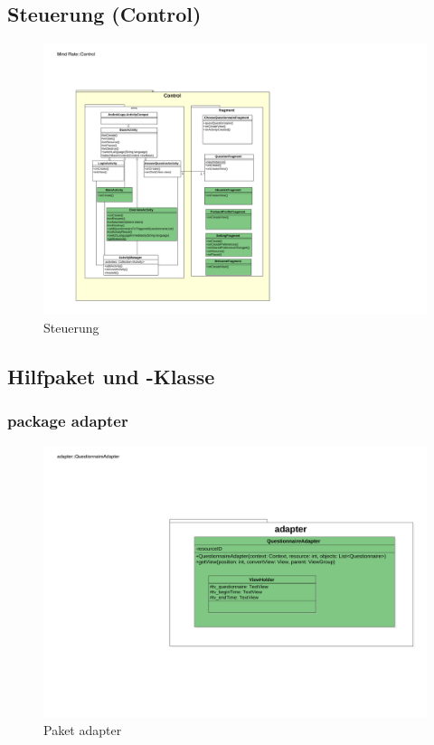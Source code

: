 \documentclass[a4paper]{scrreprt}
\begin{document}
            \subsection{Steuerung (Control)}

                \vspace*{1cm}    
                \begin{figure}[H]
                    \centering
                    \includegraphics[scale = 1.0]{Control.pdf}
                    \caption{Steuerung}
                \end{figure}


            \subsection{Hilfpaket und -Klasse}

                \subsubsection{package adapter}

                    \begin{figure}[H]
                        \centering
                        \includegraphics[scale = 0.8]{adpater.pdf}
                        \caption{Paket adapter}
                    \end{figure}
\end{document}
